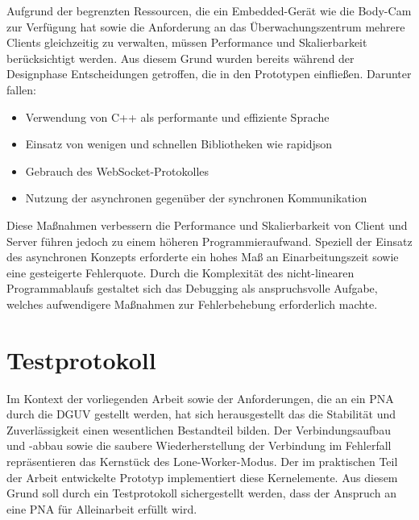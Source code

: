 \documentclass[thesis.tex]{subfiles}
\begin{document}
Aufgrund der begrenzten Ressourcen, die ein Embedded-Gerät wie die Body-Cam zur Verfügung hat sowie die Anforderung an das Überwachungszentrum mehrere Clients gleichzeitig zu verwalten, müssen Performance und Skalierbarkeit berücksichtigt werden.
Aus diesem Grund wurden bereits während der Designphase Entscheidungen getroffen, die in den Prototypen einfließen.
Darunter fallen:
\begin{itemize}
    \item Verwendung von C++ als performante und effiziente Sprache
    \item Einsatz von wenigen und schnellen Bibliotheken wie \glqq rapidjson\grqq{}
    \item Gebrauch des WebSocket-Protokolles
    \item Nutzung der asynchronen gegenüber der synchronen Kommunikation
\end{itemize}

Diese Maßnahmen verbessern die Performance und Skalierbarkeit von Client und Server führen jedoch zu einem höheren Programmieraufwand.
Speziell der Einsatz des asynchronen Konzepts erforderte ein hohes Maß an Einarbeitungszeit sowie eine gesteigerte Fehlerquote.
Durch die Komplexität des nicht-linearen Programmablaufs gestaltet sich das Debugging als anspruchsvolle Aufgabe, welches aufwendigere Maßnahmen zur Fehlerbehebung erforderlich machte.

\section{Testprotokoll}

Im Kontext der vorliegenden Arbeit sowie der Anforderungen, die an ein PNA durch die DGUV gestellt werden, hat sich herausgestellt das die Stabilität und Zuverlässigkeit einen wesentlichen Bestandteil bilden.
Der Verbindungsaufbau und -abbau sowie die saubere Wiederherstellung der Verbindung im Fehlerfall repräsentieren das Kernstück des Lone-Worker-Modus.
Der im praktischen Teil der Arbeit entwickelte Prototyp implementiert diese Kernelemente.
Aus diesem Grund soll durch ein Testprotokoll sichergestellt werden, dass der Anspruch an eine PNA für Alleinarbeit erfüllt wird.
\end{document}
